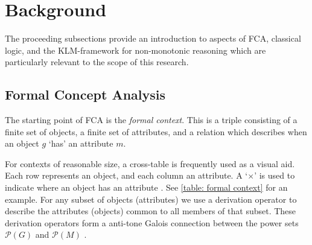 \section{Background}
\label{section: background}

The proceeding subsections provide an introduction to aspects of FCA, classical logic, and the KLM-framework for non-monotonic reasoning which are particularly relevant to the scope of this research.

\subsection{Formal Concept Analysis}
\label{subsection: formal concept analysis}

The starting point of FCA is the \textit{formal context}. This is a triple consisting of a finite set of objects, a finite set of attributes, and a relation which describes when an object $g$ `has' an attribute $m$.
%
%
For contexts of reasonable size, a cross-table is frequently used as a visual aid. Each row represents an object, and each column an attribute. A `$\times$' is used to indicate where an object has an attribute \cite{ganter1999formal,ganter2016conceptual}. See \autoref{table: formal context} for an example.
For any subset of objects (attributes) we use a derivation operator to describe the attributes (objects) common to all members of that subset. These derivation operators form a anti-tone Galois connection between the power sets $\mathcal{P}(G)$ and $\mathcal{P}(M)$ \cite{ganter1999formal}.
%
